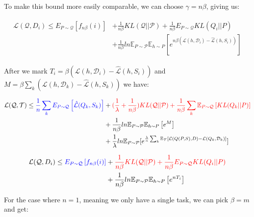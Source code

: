 \documentclass[letterpaper]{article}
\theoremstyle{definition}
\begin{document}
To make this bound more easily comparable, we can choose $\gamma=n\beta$,  giving us:


\begin{align*}
\begin{split}
\mathcal{L}(\mathcal{Q}, D_i)\leq E_{P\sim \mathcal{Q}} \left [ f_{n\beta}(i) \right ] & + \frac{1}{n\beta} KL(\mathcal{Q}||\mathcal{P}) +\frac{1}{n\beta} E_{P\sim \mathcal{Q}}KL(Q_i||P) \\ & + \frac{1}{n\beta} ln\mathbb{E}_{P\sim \mathcal{P}}\mathbb{E}_{h\sim P}\left [ e^{n\beta(\mathcal{L}(h,\mathcal{D}_i)- \hat{\mathcal{L}}(h, S_i))} \right ]
\end{split}
\end{align*}

After we mark $T_i=\beta(\mathcal{L}(h,\mathcal{D}_i)- \hat{\mathcal{L}}(h, S_i))$ and $M=\beta\sum_{k}(\mathcal{L}(h,\mathcal{D}_k)- \hat{\mathcal{L}}(h, S_k))$ we have:

\begin{align*}
\begin{split}
\mathcal{L}(\mathcal{Q}, \mathcal{T}) \leq \textcolor{blue}{\frac{1}{n}\sum_k E_{P\sim \mathcal{Q}} \left [ \hat{\mathcal{L}}(Q_k,S_k) \right ]} & + \textcolor{red}{(\frac{1}{\lambda}+ \frac{1}{n\beta}) KL(\mathcal{Q}||\mathcal{P}) + \frac{1}{n\beta}\sum_k \mathbb{E}_{P\sim \mathcal{Q}} \left [KL(Q_k||P) \right ]}\\ 
& + \frac{1}{n\beta} ln\mathbb{E}_{P\sim \mathcal{P}}\mathbb{E}_{h\sim P}\left [ e^{M} \right ]
 \\ & +\frac{1}{\lambda}ln \mathbb{E}_{P\sim \mathcal{P}} [e^{\frac{\lambda}{n}\sum_{k}\mathbb{E}_{\mathcal{T}}[\mathcal{L}(Q(P,S),D)- \mathcal{L}(Q_k, \mathcal{D}_k)]}]
\end{split}
\end{align*}

\begin{align} \label{eq-single-bound}
\begin{split}
\mathcal{L}(\mathcal{Q}, D_i)\leq \textcolor{blue}{E_{P\sim \mathcal{Q}} \left [ f_{n\beta}(i) \right ]} & + \textcolor{red}{\frac{1}{n\beta} KL(\mathcal{Q}||\mathcal{P}) +\frac{1}{n\beta}E_{P\sim \mathcal{Q}} KL(Q_i||P)} \\ & + \frac{1}{n\beta} ln\mathbb{E}_{P\sim \mathcal{P}}\mathbb{E}_{h\sim P}\left [ e^{nT_i} \right ]
\end{split}
\end{align}

For the case where $n=1$, meaning we only have a single task, we can pick $\beta=m$ and get:
\end{document}
